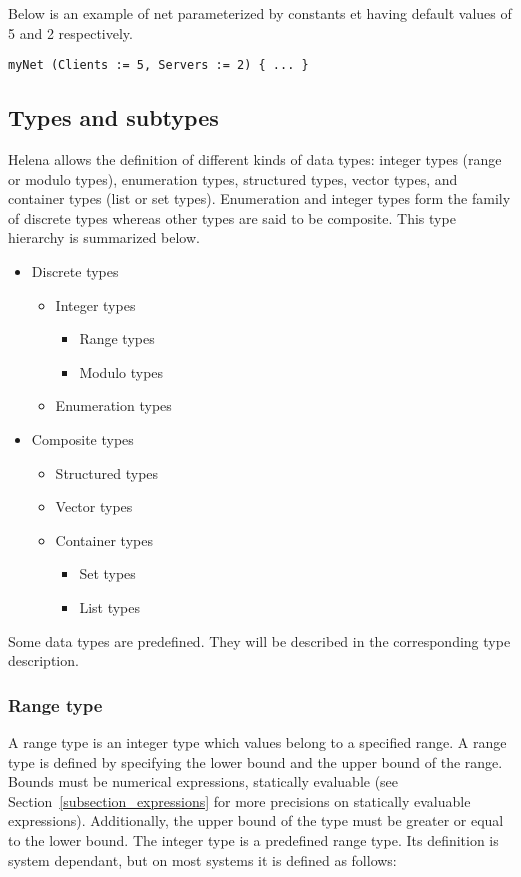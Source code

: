 Below is an example of net parameterized by constants  et
 having default values of 5 and 2 respectively.
\begin{lstlisting}
myNet (Clients := 5, Servers := 2) { ... }
\end{lstlisting}

\netparametersdef


\subsection{Types and subtypes}
Helena allows the definition of different kinds of data types: integer
types (range or modulo types), enumeration types, structured types,
vector types, and container types (list or set types).  Enumeration
and integer types form the family of discrete types whereas other
types are said to be composite.  This type hierarchy is summarized
below.
\begin{itemize}
\item Discrete types
  \begin{itemize}
  \item Integer types
    \begin{itemize}
    \item Range types
    \item Modulo types
    \end{itemize}
  \item Enumeration types
  \end{itemize}
\item Composite types
  \begin{itemize}
  \item Structured types
  \item Vector types
  \item Container types
    \begin{itemize}
    \item Set types
    \item List types
    \end{itemize}
  \end{itemize}
\end{itemize}
Some data types are predefined.  They will be described in the
corresponding type description.\\

\typedef


\subsubsection{Range type}
A range type is an integer type which values belong to a specified
range.  A range type is defined by specifying the lower bound and the
upper bound of the range.  Bounds must be numerical expressions,
statically evaluable (see Section~\ref{subsection_expressions} for
more precisions on statically evaluable expressions).  Additionally,
the upper bound of the type must be greater or equal to the lower
bound.  The integer type  is a predefined range type.  Its
definition is system dependant, but on most systems it is defined as
follows:\\ \\


